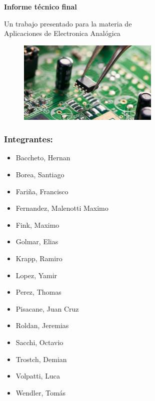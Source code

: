 \documentclass{article}
\begin{document}
\begin{titlepage}
	\begin{center}
		\vspace{1cm}

		{\Huge
		\textbf{Informe técnico final}}

		\vspace{0.5cm}
		{\Large
		Un trabajo presentado para la materia de \\
		Aplicaciones de Electronica Analógica}
				
		\vspace{0.5cm}
		\begin{figure}[H]
			\centering
			\includegraphics[width=0.6\textwidth]{logo.jpeg}
		\end{figure}
		
		\vfill
	
	\end{center}
	\subsubsection{Integrantes:}
	\begin{itemize}
		\item	Baccheto, Hernan
		\item	Borea, Santiago
		\item	Fariña, Francisco
		\item	Fernandez, Malenotti Maximo
		\item	Fink, Maximo
		\item	Golmar, Elias
		\item	Krapp, Ramiro
		\item	Lopez, Yamir
		\item	Perez, Thomas
		\item	Pisacane, Juan Cruz
		\item	Roldan, Jeremias
		\item	Sacchi, Octavio
		\item	Trostch, Demian
		\item	Volpatti, Luca
		\item	Wendler, Tomás
	\end{itemize}
	

\end{titlepage}
\end{document}

